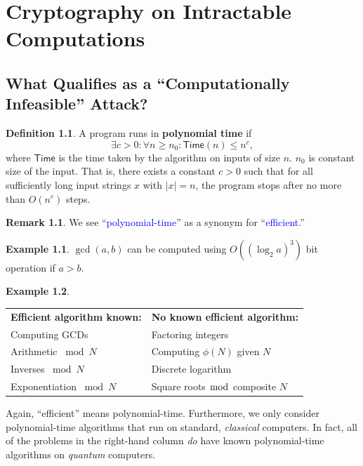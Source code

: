 \documentclass[12pt,openany]{book}
\theoremstyle{definition}
\newtheorem{definition}{Definition}[chapter]
\newtheorem{remark}{Remark}[chapter]
\newtheorem{example}{Example}[chapter]
\renewcommand{\abs}[1]{\left\lvert #1 \right\rvert}
\begin{document}
	\newpage
	\chapter{Cryptography on Intractable Computations}
	
	
	\section{What Qualifies as a ``Computationally Infeasible'' Attack?}
	\begin{tcolorbox}[colframe=defcolor,title={\color{white}\bf Polynomial Time}]
		\begin{definition}
			A program runs in \textbf{polynomial time} if \[
			\exists c>0:\forall n\geq n_0:\mathsf{Time}(n)\leq n^c,
			\] where \(\mathsf{Time}\) is the time taken by the algorithm on inputs of size \(n\). \(n_0\) is constant size of  the input. That is, there exists a constant $c > 0$ such that for all sufficiently long input strings $x$ with $\abs{x}=n$, the program stops after no more than $O(n^c)$ steps.
		\end{definition}
	\end{tcolorbox}
	\begin{remark}
		We see ``\textcolor{blue}{polynomial-time}'' as a synonym for ``\textcolor{blue}{efficient}.''
	\end{remark}
	\vspace{10pt}
	\begin{example}
		\(\gcd(a,b)\) can be computed using \(O((\log_2a)^3)\) bit operation if \(a>b\).
	\end{example}
	\vspace{10pt}
	\begin{example}
		\ \begin{table}[h!]\centering
			\begin{tabular}{l|l}
				\textbf{Efficient algorithm known:} & \textbf{No known efficient algorithm:}\\
				Computing GCDs & Factoring integers\\
				Arithmetic \(\bmod N\) & Computing \(\phi(N)\) given \(N\) \\
				Inverses \(\bmod N\) & Discrete logarithm \\
				Exponentiation \(\bmod N\) & Square roots \(\bmod\) composite \(N\) \\
			\end{tabular}
		\end{table}
	
		Again, ``efficient'' means polynomial-time. Furthermore, we only consider polynomial-time algorithms that run on standard, \textit{classical} computers. In fact, all of the problems in the right-hand column \textit{do} have known polynomial-time algorithms on \textit{quantum} computers.
	\end{example}
	\newpage
\end{document}
